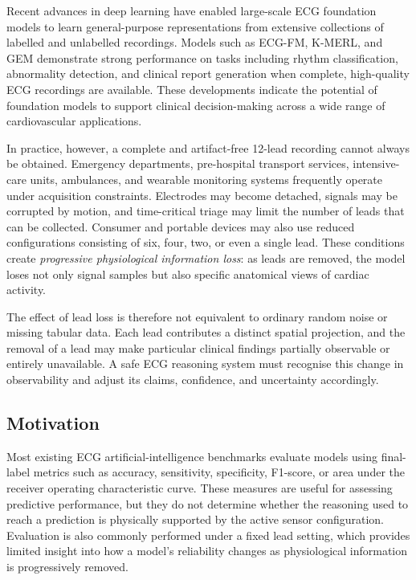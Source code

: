 \documentclass{ssnreview}
\begin{document}
Recent advances in deep learning have enabled large-scale ECG foundation models to learn
general-purpose representations from extensive collections of labelled and unlabelled
recordings. Models such as ECG-FM, K-MERL, and GEM demonstrate strong performance on
tasks including rhythm classification, abnormality detection, and clinical report
generation when complete, high-quality ECG recordings are available. These developments
indicate the potential of foundation models to support clinical decision-making across a
wide range of cardiovascular applications.

In practice, however, a complete and artifact-free 12-lead recording cannot always be
obtained. Emergency departments, pre-hospital transport services, intensive-care units,
ambulances, and wearable monitoring systems frequently operate under acquisition
constraints. Electrodes may become detached, signals may be corrupted by motion, and
time-critical triage may limit the number of leads that can be collected. Consumer and
portable devices may also use reduced configurations consisting of six, four, two, or even
a single lead. These conditions create \emph{progressive physiological information loss}:
as leads are removed, the model loses not only signal samples but also specific anatomical
views of cardiac activity.

The effect of lead loss is therefore not equivalent to ordinary random noise or missing
tabular data. Each lead contributes a distinct spatial projection, and the removal of a
lead may make particular clinical findings partially observable or entirely unavailable.
A safe ECG reasoning system must recognise this change in observability and adjust its
claims, confidence, and uncertainty accordingly.

\subsection*{Motivation}

Most existing ECG artificial-intelligence benchmarks evaluate models using final-label
metrics such as accuracy, sensitivity, specificity, F1-score, or area under the receiver
operating characteristic curve. These measures are useful for assessing predictive
performance, but they do not determine whether the reasoning used to reach a prediction
is physically supported by the active sensor configuration. Evaluation is also commonly
performed under a fixed lead setting, which provides limited insight into how a model's
reliability changes as physiological information is progressively removed.
\end{document}
